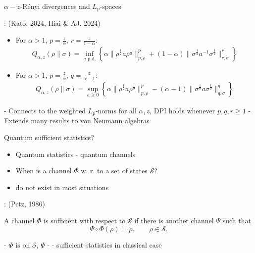 \documentclass[mathserif]{beamer}
\newcommand{\<}{\langle}
\renewcommand{\>}{\rangle}
\newcommand{\Se}{\mathcal S}
\begin{document}
\begin{frame}{$\alpha-z$-R\'enyi divergences and $L_p$-spaces}

: {\small (Kato, 2024, Hiai \& AJ, 2024)}

\bigskip

\begin{itemize}
\item For $\alpha>1$, $p=\frac{z}{\alpha}$, $r=\frac{z}{1-\alpha}$:
\begin{multline*}
Q_{\alpha,z}(\rho\|\sigma)=\inf_{a
\text{ p.d.}}\left\{\alpha\|\rho^{\frac 12}a\rho^{\frac
12}\|^p_{p,\rho}+(1-\alpha)\|\sigma^{\frac 12}a^{-1}\sigma^{\frac 12}\|^r_{r,\sigma}\right\}
\end{multline*}

\item For $\alpha>1$, $p=\frac{z}{\alpha}$, $q=\frac{z}{\alpha-1}$:
\begin{multline*}
Q_{\alpha,z}(\rho\|\sigma)=\sup_{a\ge 0} \left\{\alpha\|\rho^{\frac 12}a\rho^{\frac
12}\|^p_{p,\rho}- (\alpha-1)\|\sigma^{\frac 12}a\sigma^{\frac 12}\|^q_{q,\sigma}
 \right\}
\end{multline*}

\end{itemize}

\medskip

- Connects to the weighted $L_p$-norms for all $\alpha, z$, DPI holds whenever $p,q,r\ge 1$
\vskip 3mm
- Extends many results to von Neumann algebras

\end{frame}


\begin{frame}{Quantum sufficient statistics?}

\begin{itemize}

\item Quantum statistics - quantum channels
\vskip 3mm
\item When is a channel $\Phi$  w. r. to a set of states
$\mathcal S$?
\vskip 3mm
\item {} do not exist in most situations


\end{itemize}

\bigskip 

: {\small (Petz, 1986)}

\medskip 
A channel $\Phi$ is sufficient with respect to $\mathcal S$ if there is another channel
$\Psi$ such that 
\[
\Psi\circ\Phi(\rho)=\rho,\qquad \rho\in \Se.
\]

- $\Phi$ is  on $\Se$, $\Psi$ - 
\vskip 2mm
- sufficient statistics in classical case

\end{frame}
\end{document}
